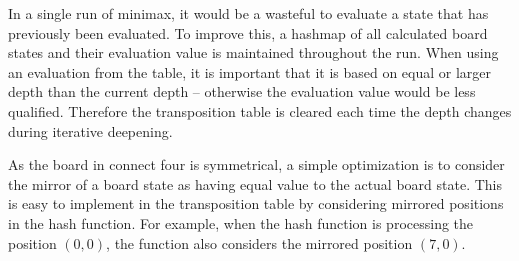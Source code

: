 In a single run of minimax, it would be a wasteful to evaluate a state that has previously been evaluated.
To improve this, a hashmap of all calculated board states and their evaluation value is maintained throughout the run.
When using an evaluation from the table, it is important that it is based on equal or larger depth than the current depth -- otherwise the evaluation value would be less qualified.
Therefore the transposition table is cleared each time the depth changes during iterative deepening.

As the board in connect four is symmetrical, a simple optimization is to consider the mirror of a board state as having equal value to the actual board state.
This is easy to implement in the transposition table by considering mirrored positions in the hash function.
For example, when the hash function is processing the position $(0, 0)$, the function also considers the mirrored position $(7,0)$.
